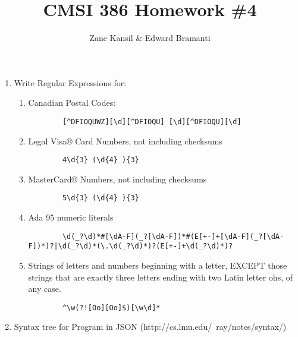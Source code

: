 \documentclass{article}
\begin{document}
\title{CMSI 386 Homework \#4}
\author{Zane Kansil \& Edward Bramanti}
\maketitle
\begin{enumerate}
    \item Write Regular Expressions for: 
    \begin{enumerate}
        \item Canadian Postal Codes:
        \begin{verbatim}
        [^DFIOQUWZ][\d][^DFIOQU] [\d][^DFIOQU][\d]
        \end{verbatim}
        \item Legal Visa® Card Numbers, not including checksums
        \begin{verbatim}
        4\d{3} (\d{4} ){3}
        \end{verbatim}
        \item MasterCard® Numbers, not including checksums
        \begin{verbatim}
        5\d{3} (\d{4} ){3}
        \end{verbatim}
        \item Ada 95 numeric literals
        \begin{verbatim}
        \d(_?\d)*#[\dA-F](_?[\dA-F])*#(E[+-]+[\dA-F](_?[\dA-F])*)?|\d(_?\d)*(\.\d(_?\d)*)?(E[+-]+\d(_?\d)*)?
        \end{verbatim}
        \item Strings of letters and numbers beginning with a letter, EXCEPT those strings that are exactly three letters ending with two Latin letter ohs, of any case.
        \begin{verbatim}
        ^\w(?![Oo][Oo]$)[\w\d]*
        \end{verbatim}
    \end{enumerate}
    \pagebreak
    \item Syntax tree for Program in JSON (http://cs.lmu.edu/~ray/notes/syntax/)
    
    \pagebreak
\end{enumerate}
\end{document}
